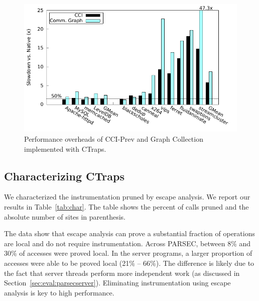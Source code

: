 \documentclass[preprint,10pt]{sigplanconf}
\newcommand{\addtodo}[1]{\textcolor{red}{[To do: #1]}}
\newcommand{\ctraps}{CTraps\xspace}
\begin{document}


\begin{figure}
\centering
\includegraphics[width=.9\columnwidth]{plots/appperf.pdf}
\caption{\label{fig:perfapps}Performance overheads of CCI-Prev and Graph Collection implemented with \ctraps.}
\end{figure}


\subsection{Characterizing \ctraps}
\label{sec:char}
We characterized the instrumentation pruned by escape analysis.  We report our
results in Table~\ref{tab:char}.  The table shows the percent of
calls pruned and the absolute number of sites in parenthesis.

The data show that escape analysis can prove a substantial fraction of
operations are local and do not require instrumentation.  Across PARSEC,
between 8\% and 30\% of accesses were proved local.  In the server programs, a
larger proportion of accesses were able to be proved local (21\% -- 66\%).  The
difference is likely due to the fact that server threads perform more
independent work (as discussed in Section~\ref{sec:eval:parsecserver}).
Eliminating instrumentation using escape analysis is key to high performance.  
\end{document}
